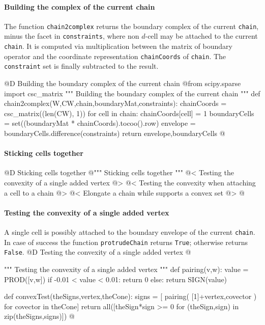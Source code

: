 \documentclass[11pt,oneside]{article}	%
\begin{document}
\paragraph{Building the complex of the current chain}
The function \texttt{chain2complex} returns the boundary complex of the current \texttt{chain}, minus the facet in \texttt{constraints}, where non $d$-cell may be attached to the current \texttt{chain}.
It is computed via multiplication between the matrix of boundary operator and the coordinate representation \texttt{chainCoords} of \texttt{chain}. The \texttt{constraint} set is finally subtracted to the result.  

@D Building the boundary complex of the current chain
@{from scipy.sparse import csc_matrix
""" Building the boundary complex of the current chain """
def chain2complex(W,CW,chain,boundaryMat,constraints):
	chainCoords = csc_matrix((len(CW), 1))
	for cell in chain: chainCoords[cell] = 1
	boundaryCells = set((boundaryMat * chainCoords).tocoo().row)
	envelope = boundaryCells.difference(constraints)
	return envelope,boundaryCells
@}

\paragraph{Sticking cells together}
@D Sticking cells together
@{""" Sticking cells together """
@< Testing the convexity of a single added vertex @>
@< Testing the convexity when attaching a cell to a chain @>
@< Elongate a chain while supports a convex set @>
@}

\paragraph{Testing the convexity of a single added vertex}
A single cell is possibly attached to the boundary envelope of the current \texttt{chain}. In case of success
the function \texttt{protrudeChain} returns \texttt{True}; otherwise returns \texttt{False}. 
@D Testing the convexity of a single added vertex
@{""" Testing the convexity of a single added vertex """
def pairing(v,w):
	value = PROD([v,w])
	if -0.01 < value < 0.01: return 0
	else: return SIGN(value)

def convexTest(theSigns,vertex,theCone):
	signs = [ pairing( [1]+vertex,covector ) for covector in theCone]
	return all([theSign*sign >= 0 for (theSign,sign) in zip(theSigns,signs)])
@}
\end{document}
